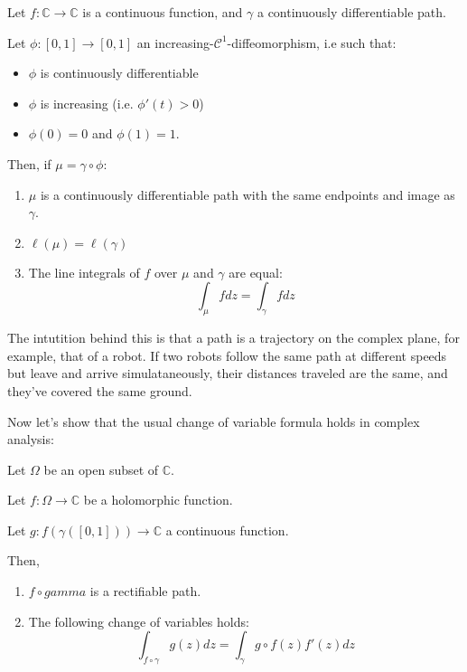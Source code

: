 \begin{thm*}
Let $f: \mathbb{C} \rightarrow \mathbb{C}$ is a continuous function, and $\gamma$ a continuously differentiable path.

Let $\phi: [0,1] \rightarrow [0,1]$ an increasing-$\mathcal{C}^1$-diffeomorphism, i.e such that:
\begin{itemize}
    \item $\phi$ is continuously differentiable
    \item $\phi$ is increasing (i.e. $\phi'(t) > 0$)
    \item $\phi(0) = 0$ and $\phi(1)=1$.
\end{itemize}

Then, if $\mu = \gamma \circ \phi$:
\begin{enumerate}
    \item $\mu$ is a continuously differentiable path with the same endpoints and image as $\gamma$.
    \item $\ell(\mu) = \ell(\gamma)$
    \item The line integrals of $f$ over $\mu$ and $\gamma$ are equal:
        $$ \int_\mu fdz = \int_\gamma fdz $$
\end{enumerate}
\end{thm*}

\begin{note}
    The intutition behind this is that a path is a trajectory on the complex plane, for example, that of a robot. If two robots follow the same path at different speeds but leave and arrive simulataneously, their distances traveled are the same, and they've covered the same ground.
\end{note}

Now let's show that the usual change of variable formula holds in complex analysis:

\begin{thm*}
    Let $\Omega$ be an open subset of $\mathbb{C}$.

    Let $f: \Omega \rightarrow \mathbb{C}$ be a holomorphic function.

    Let $g: f(\gamma([0,1])) \rightarrow \mathbb{C}$ a continuous function.

    Then,
    \begin{enumerate}
        \item $f\circ gamma$ is a rectifiable path.
        \item The following change of variables holds:
            $$\int_{f \circ \gamma}g(z)dz = \int_\gamma g\circ f(z)f'(z)dz$$
    \end{enumerate}

\end{thm*}

